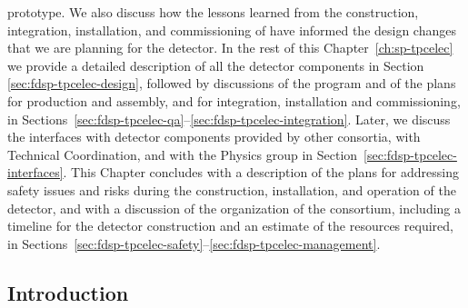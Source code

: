 prototype. We also discuss how the lessons learned from the construction,
integration, installation, and commissioning of  have 
informed the design changes that we are planning for the 
 detector. In the rest of this Chapter~\ref{ch:sp-tpcelec} we provide a detailed
description of all the  detector components in Section
\ref{sec:fdsp-tpcelec-design}, followed by discussions of the 
program and of the plans for production and assembly, and for integration,
installation and commissioning, in 
Sections~\ref{sec:fdsp-tpcelec-qa}--\ref{sec:fdsp-tpcelec-integration}. 
Later, we discuss the interfaces with detector components provided by 
other consortia, with Technical Coordination, and with the Physics group
in Section~\ref{sec:fdsp-tpcelec-interfaces}. This Chapter concludes with a description
of the plans for addressing safety issues and risks during the
construction, installation, and operation of the detector, and with
a discussion of the organization of the  consortium,
including a timeline for the detector construction and an estimate
of the resources required, in 
Sections~\ref{sec:fdsp-tpcelec-safety}--\ref{sec:fdsp-tpcelec-management}.

\subsection{Introduction}
\label{sec:fdsp-tpcelec-overview-intro}


